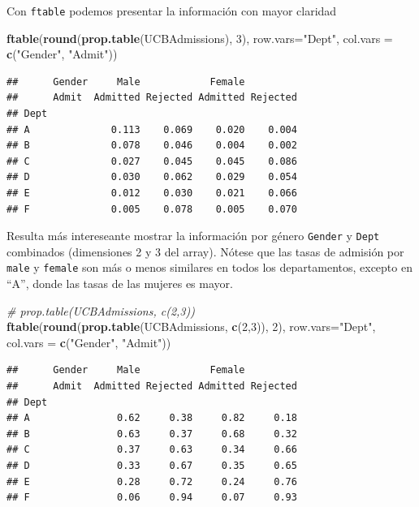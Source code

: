 \documentclass[]{book}
\newenvironment{Shaded}{\begin{snugshade}}{\end{snugshade}}
\newcommand{\KeywordTok}[1]{\textcolor[rgb]{0.13,0.29,0.53}{\textbf{#1}}}
\newcommand{\DataTypeTok}[1]{\textcolor[rgb]{0.13,0.29,0.53}{#1}}
\newcommand{\DecValTok}[1]{\textcolor[rgb]{0.00,0.00,0.81}{#1}}
\newcommand{\StringTok}[1]{\textcolor[rgb]{0.31,0.60,0.02}{#1}}
\newcommand{\CommentTok}[1]{\textcolor[rgb]{0.56,0.35,0.01}{\textit{#1}}}
\newcommand{\NormalTok}[1]{#1}
\begin{document}
Con \texttt{ftable} podemos presentar la información con mayor claridad

\begin{Shaded}
\begin{Highlighting}[]
\KeywordTok{ftable}\NormalTok{(}\KeywordTok{round}\NormalTok{(}\KeywordTok{prop.table}\NormalTok{(UCBAdmissions), }\DecValTok{3}\NormalTok{),}
       \DataTypeTok{row.vars=}\StringTok{"Dept"}\NormalTok{, }\DataTypeTok{col.vars =} \KeywordTok{c}\NormalTok{(}\StringTok{"Gender"}\NormalTok{, }\StringTok{"Admit"}\NormalTok{))}
\end{Highlighting}
\end{Shaded}

\begin{verbatim}
##      Gender     Male            Female         
##      Admit  Admitted Rejected Admitted Rejected
## Dept                                           
## A              0.113    0.069    0.020    0.004
## B              0.078    0.046    0.004    0.002
## C              0.027    0.045    0.045    0.086
## D              0.030    0.062    0.029    0.054
## E              0.012    0.030    0.021    0.066
## F              0.005    0.078    0.005    0.070
\end{verbatim}

Resulta más intereseante mostrar la información por género
\texttt{Gender} y \texttt{Dept} combinados (dimensiones 2 y 3 del
array). Nótese que las tasas de admisión por \texttt{male} y
\texttt{female} son más o menos similares en todos los departamentos,
excepto en ``A'', donde las tasas de las mujeres es mayor.

\begin{Shaded}
\begin{Highlighting}[]
\CommentTok{# prop.table(UCBAdmissions, c(2,3))}
\KeywordTok{ftable}\NormalTok{(}\KeywordTok{round}\NormalTok{(}\KeywordTok{prop.table}\NormalTok{(UCBAdmissions, }\KeywordTok{c}\NormalTok{(}\DecValTok{2}\NormalTok{,}\DecValTok{3}\NormalTok{)), }\DecValTok{2}\NormalTok{),}
       \DataTypeTok{row.vars=}\StringTok{"Dept"}\NormalTok{, }\DataTypeTok{col.vars =} \KeywordTok{c}\NormalTok{(}\StringTok{"Gender"}\NormalTok{, }\StringTok{"Admit"}\NormalTok{))}
\end{Highlighting}
\end{Shaded}

\begin{verbatim}
##      Gender     Male            Female         
##      Admit  Admitted Rejected Admitted Rejected
## Dept                                           
## A               0.62     0.38     0.82     0.18
## B               0.63     0.37     0.68     0.32
## C               0.37     0.63     0.34     0.66
## D               0.33     0.67     0.35     0.65
## E               0.28     0.72     0.24     0.76
## F               0.06     0.94     0.07     0.93
\end{verbatim}
\end{document}

